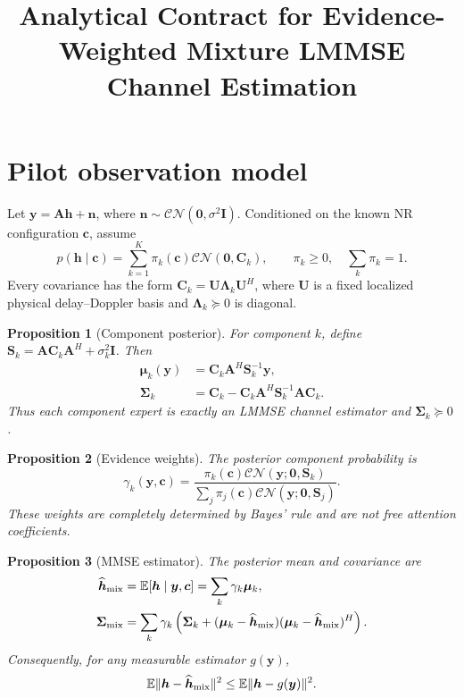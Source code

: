 \documentclass[10pt]{article}
\newtheorem{proposition}{Proposition}
\begin{document}
\title{Analytical Contract for Evidence-Weighted Mixture LMMSE Channel Estimation}
\author{}
\date{}
\maketitle

\section{Pilot observation model}
Let $\bm y=\bm A\bm h+\bm n$, where
$\bm n\sim\mathcal{CN}(\bm 0,\sigma^2\bm I)$.  Conditioned on the known NR
configuration $\bm c$, assume
\begin{equation}
 p(\bm h\mid\bm c)=\sum_{k=1}^{K}\pi_k(\bm c)
 \mathcal{CN}(\bm 0,\bm C_k),\qquad
 \pi_k\ge 0,\quad\sum_k\pi_k=1.
\end{equation}
Every covariance has the form
$\bm C_k=\bm U\bm\Lambda_k\bm U^H$, where $\bm U$ is a fixed localized
physical delay--Doppler basis and $\bm\Lambda_k\succeq 0$ is diagonal.

\begin{proposition}[Component posterior]
For component $k$, define
$\bm S_k=\bm A\bm C_k\bm A^H+\sigma_k^2\bm I$.  Then
\begin{align}
 \bm\mu_k(\bm y)&=\bm C_k\bm A^H\bm S_k^{-1}\bm y,\\
 \bm\Sigma_k&=\bm C_k-\bm C_k\bm A^H\bm S_k^{-1}\bm A\bm C_k.
\end{align}
Thus each component expert is exactly an LMMSE channel estimator and
$\bm\Sigma_k\succeq 0$.
\end{proposition}

\begin{proposition}[Evidence weights]
The posterior component probability is
\begin{equation}
 \gamma_k(\bm y,\bm c)=
 \frac{\pi_k(\bm c)\mathcal{CN}(\bm y;\bm 0,\bm S_k)}
 {\sum_j\pi_j(\bm c)\mathcal{CN}(\bm y;\bm 0,\bm S_j)}.
\end{equation}
These weights are completely determined by Bayes' rule and are not free
attention coefficients.
\end{proposition}

\begin{proposition}[MMSE estimator]
The posterior mean and covariance are
\begin{align}
 \widehat{\bm h}_{\rm mix}
 &=\mathbb E[\bm h\mid\bm y,\bm c]
 =\sum_k\gamma_k\bm\mu_k,\\
 \bm\Sigma_{\rm mix}
 &=\sum_k\gamma_k\left(\bm\Sigma_k+
 (\bm\mu_k-\widehat{\bm h}_{\rm mix})
 (\bm\mu_k-\widehat{\bm h}_{\rm mix})^H\right).
\end{align}
Consequently, for any measurable estimator $g(\bm y)$,
\begin{equation}
 \mathbb E\|\bm h-\widehat{\bm h}_{\rm mix}\|^2
 \le \mathbb E\|\bm h-g(\bm y)\|^2.
\end{equation}
\end{proposition}
\end{document}
